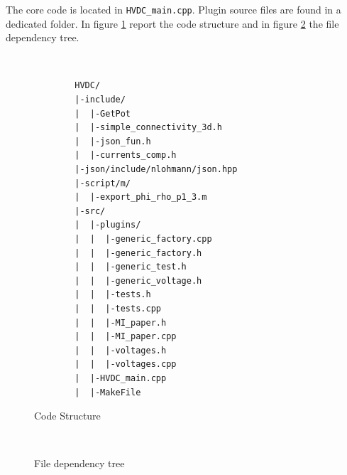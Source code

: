 \documentclass[11pt,a4paper]{article}
\begin{document}
The core code is located in \texttt{HVDC\_main.cpp}. Plugin source files are found in a dedicated folder. In figure \ref{fig:code-struc} report the code structure and in figure \ref{fig:file-struc} the file dependency tree.
\begin{figure}[h]
\begin{minipage}{5cm}
	\caption{Code Structure}\label{fig:code-struc}
\end{minipage}\\
\begin{minipage}[t]{7cm}
	\small
	\begin{verbatim}
		HVDC/
		|-include/
		|  |-GetPot
		|  |-simple_connectivity_3d.h
		|  |-json_fun.h
		|  |-currents_comp.h
		|-json/include/nlohmann/json.hpp
		|-script/m/
		|  |-export_phi_rho_p1_3.m
		|-src/
		|  |-plugins/
		|  |  |-generic_factory.cpp
		|  |  |-generic_factory.h
		|  |  |-generic_test.h
		|  |  |-generic_voltage.h
		|  |  |-tests.h
		|  |  |-tests.cpp
		|  |  |-MI_paper.h
		|  |  |-MI_paper.cpp
		|  |  |-voltages.h
		|  |  |-voltages.cpp
		|  |-HVDC_main.cpp
		|  |-MakeFile
	\end{verbatim}
\end{minipage}
\end{figure}
\begin{figure}[h]
\begin{minipage}{\textwidth}
	\caption{File dependency tree}\label{fig:file-struc}
\end{minipage}\\
\begin{minipage}{\textwidth}
\end{minipage}
\end{figure}
\end{document}
